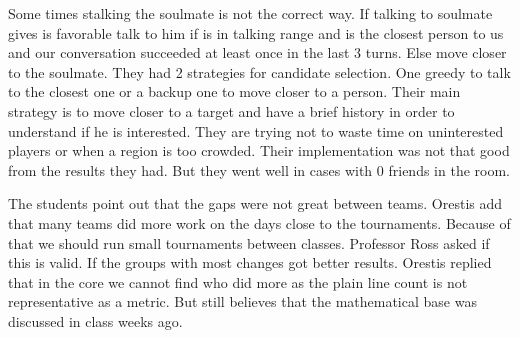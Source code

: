 Some times stalking the soulmate is not the correct way. If talking to soulmate 
gives is favorable talk to him if is in talking range and is the closest person
to us and our conversation succeeded at least once in the last 3 turns. Else
move closer to the soulmate. They had 2 strategies for candidate selection. One 
greedy to talk to the closest one or a backup one to move closer to a person.
Their main strategy is to move closer to a target and have a brief history in 
order to understand if he is interested. They are trying not to waste time on
uninterested players or when a region is too crowded. Their implementation 
was not that good from the results they had. But they went well in cases with
0 friends in the room.


The students point out that the gaps were not great between teams. Orestis add
that many teams did more work on the days close to the tournaments. Because of 
that we should run small tournaments between classes. Professor Ross asked if
this is valid. If the groups with most changes got better results. Orestis replied
that in the core we cannot find who did more as the plain line count is not 
representative as a metric. But still believes that the mathematical base was
discussed in class weeks ago.
